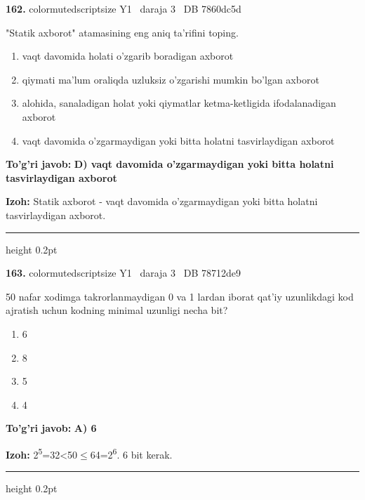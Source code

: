 \documentclass[10pt,a4paper,oneside]{article}
\begin{document}
\noindent\textbf{\color{ink}162.}  {color{muted}scriptsize Y1 \textbullet\ daraja 3 \textbullet\ DB 7860dc5d}
\par
"Statik axborot" atamasining eng aniq ta'rifini toping.
\begin{enumerate}[label=\Alph*),leftmargin=9mm]
\item vaqt davomida holati o'zgarib boradigan axborot
\item qiymati ma'lum oraliqda uzluksiz o'zgarishi mumkin bo'lgan axborot
\item alohida, sanaladigan holat yoki qiymatlar ketma-ketligida ifodalanadigan axborot
\item vaqt davomida o'zgarmaydigan yoki bitta holatni tasvirlaydigan axborot
\end{enumerate}
\begin{tcolorbox}[enhanced,breakable,colback=teal!4,colframe=teal!50!black,boxrule=0.5pt,arc=1.1mm,left=3mm,right=3mm,top=1.7mm,bottom=1.7mm,before skip=2mm,after skip=2mm]
\textbf{\color{teal}To'g'ri javob:} \textbf{D) vaqt davomida o'zgarmaydigan yoki bitta holatni tasvirlaydigan axborot}
\par\smallskip
\textbf{Izoh:} Statik axborot - vaqt davomida o'zgarmaydigan yoki bitta holatni tasvirlaydigan axborot.
\end{tcolorbox}
\vspace{2mm}\hrule height 0.2pt \vspace{3mm}

\noindent\textbf{\color{ink}163.}  {color{muted}scriptsize Y1 \textbullet\ daraja 3 \textbullet\ DB 78712de9}
\par
50 nafar xodimga takrorlanmaydigan 0 va 1 lardan iborat qat'iy uzunlikdagi kod ajratish uchun kodning minimal uzunligi necha bit?
\begin{enumerate}[label=\Alph*),leftmargin=9mm]
\item 6
\item 8
\item 5
\item 4
\end{enumerate}
\begin{tcolorbox}[enhanced,breakable,colback=teal!4,colframe=teal!50!black,boxrule=0.5pt,arc=1.1mm,left=3mm,right=3mm,top=1.7mm,bottom=1.7mm,before skip=2mm,after skip=2mm]
\textbf{\color{teal}To'g'ri javob:} \textbf{A) 6}
\par\smallskip
\textbf{Izoh:} 2\textsuperscript{5}=32\textless{}50\ensuremath{\leq}64=2\textsuperscript{6}. 6 bit kerak.
\end{tcolorbox}
\vspace{2mm}\hrule height 0.2pt \vspace{3mm}
\end{document}
